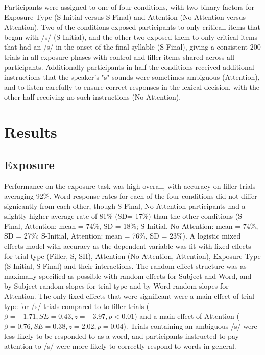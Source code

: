 \documentclass[a4paper,11pt,twocolumn]{article}
\begin{document}
Participants were assigned to one of four conditions, with two binary factors for Exposure Type (S-Initial versus S-Final) and Attention (No Attention versus Attention).  Two of the conditions exposed participants to only criticall items that began with /s/ (S-Initial), and the other two exposed them to only critical items that had an /s/ in the onset of the final syllable (S-Final), giving a consistent 200 trials in all exposure phases with control and filler items shared across all participants.  Additionally participants in half the conditions received additional instructions that the speaker's "s" sounds were sometimes ambiguous (Attention), and to listen carefully to ensure correct responses in the lexical decision, with the other half receiving no such instructions (No Attention).

\section{Results}

\subsection{Exposure}

Performance on the exposure task was high overall, with accuracy on filler trials averaging 92\%.  Word response rates for each of the four conditions did not differ signicantly from each other, though S-Final, No Attention participants  had a slightly higher average rate of 81\% (SD= 17\%) than the other conditions (S-Final, Attention: mean = 74\%, SD = 18\%; S-Initial, No Attention: mean = 74\%, SD = 27\%; S-Initial, Attention: mean = 76\%, SD = 23\%).  A logistic mixed effects model with accuracy as the dependent variable was fit with fixed effects for trial type (Filler, S, SH), Attention (No Attention, Attention), Exposure Type (S-Initial, S-Final) and their interactions. The random effect structure was as maximally specified as possible with random effects for Subject and Word, and by-Subject random slopes for trial type and by-Word random slopes for Attention. The only fixed effects that were significant were a main effect of trial type for /s/ trials compared to to filler trials ($\beta = -1.71, SE = 0.43, z = -3.97, p < 0.01$) and a main effect of Attention ($\beta = 0.76, SE = 0.38, z = 2.02,   p = 0.04$).  Trials containing an ambiguous /s/ were less likely to be responded to as a word, and participants instructed to pay attention to /s/ were more likely to correctly respond to words in general.
\end{document}
